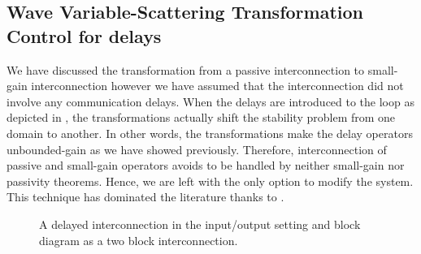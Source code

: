 \subsection{Wave Variable-Scattering Transformation Control for delays}

We have discussed the transformation from a passive interconnection to small-gain interconnection however
we have assumed that the interconnection did not involve any communication delays. When the delays are 
introduced to the loop as depicted in , the transformations actually shift the stability problem from
one domain to another. In other words, the transformations make the delay operators unbounded-gain as we have showed previously. 
Therefore, interconnection of passive and small-gain operators avoids to be handled by neither small-gain nor passivity theorems. 
Hence, we are left with the only option to modify the system. This technique has dominated the literature thanks to 
\cite{andersonspong,nieslotine, nieslotine2}. 

%

\begin{figure}%
\centering
{}
\caption[A delayed interconnection]{A delayed interconnection in the input/output setting and 
block diagram as a two block interconnection.}%
\label{lit:syn:delinc}%
\end{figure}

